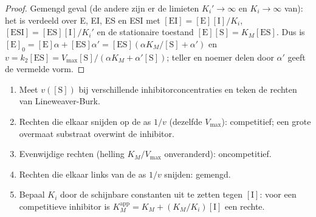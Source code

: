 \begin{proof}
Gemengd geval (de andere zijn er de limieten $K_i' \to \infty$ en $K_i \to \infty$ van): het 
is verdeeld over E, EI, ES en ESI met $[\mathrm{EI}] = [\mathrm E][\mathrm I]/K_i$, $[\mathrm{ESI}] = [\mathrm{ES}][\mathrm I]/K_i'$
en de stationaire toestand $[\mathrm E][\mathrm S] = K_M[\mathrm{ES}]$. Dus is $[\mathrm E]_0 = [\mathrm E]\alpha + [\mathrm{ES}]\alpha' =
[\mathrm{ES}](\alpha K_M/[\mathrm S] + \alpha')$ en $v = k_2[\mathrm{ES}] = V_{\max}[\mathrm S]/(\alpha K_M + \alpha'[\mathrm S])$; teller
en noemer delen door $\alpha'$ geeft de vermelde vorm.
\end{proof}

\begin{method}\label{met:b3:complex-kinetics:inhibition-type}
\begin{enumerate}
  \item Meet $v([\mathrm S])$ bij verschillende inhibitorconcentraties en
        teken de rechten van Lineweaver-Burk.
  \item Rechten die elkaar snijden op de as $1/v$ (dezelfde $V_{\max}$):
        competitief; een grote overmaat substraat overwint de inhibitor.
  \item Evenwijdige rechten (helling $K_M/V_{\max}$ onveranderd): oncompetitief.
  \item Rechten die elkaar links van de as $1/v$ snijden: gemengd.
  \item Bepaal $K_i$ door de schijnbare constanten uit te zetten tegen
        $[\mathrm I]$: voor een competitieve inhibitor is $K_M^{\mathrm{app}} = K_M + (K_M/K_i)[\mathrm I]$ een rechte.
\end{enumerate}
\end{method}

